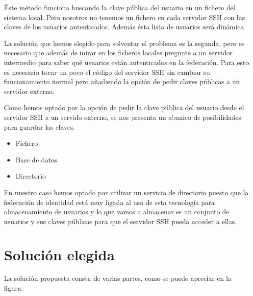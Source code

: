     Éste método funciona buscando la clave pública del usuario en un
    fichero del sistema local. Pero nosotros no tenemos un fichero en cada
    servidor SSH con las claves de los usuarios autenticados. Además ésta
    lista de usuarios será dinámica.

    La solución que hemos elegido para solventar el problema es la segunda,
    pero es necesario que además de mirar en los ficheros locales pregunte
    a un servidor intermedio para saber qué usuarios están autenticados en
    la federación. Para esto es necesario tocar un poco el código del
    servidor SSH sin cambiar su funcionamiento normal pero añadiendo la
    opción de pedir claves públicas a un servidor externo.

    Como hemos optado por la opción de pedir la clave pública del usuario
    desde el servidor SSH a un servido externo, se nos presenta un abanico
    de posibilidades para guardar las claves.

    \begin{itemize}
    
    \item Fichero
    \item Base de datos
    \item Directorio

    \end{itemize}

    En nuestro caso hemos optado por utilizar un servicio de directorio puesto que la
    federación de identidad está muy ligada al uso de esta tecnología para
    almacenamiento de usuarios y lo que vamos a almacenar es un conjunto
    de usuarios y sus claves públicas para que el servidor SSH pueda
    acceder a ellas.

    \section{Solución elegida}

    La solución propuesta consta de varias partes, como se puede apreciar
    en la figura:

